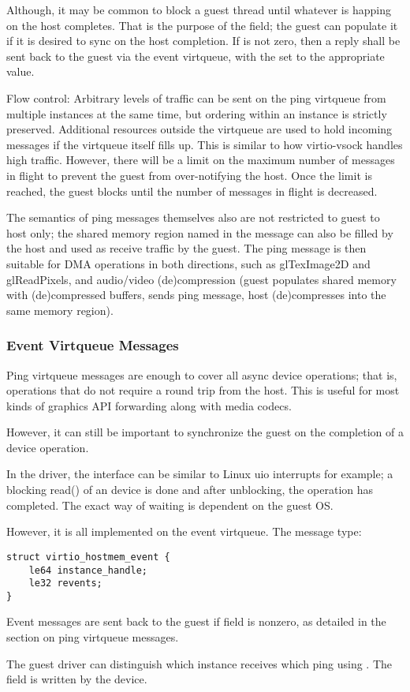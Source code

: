 Although, it may be common to block a guest thread until whatever is happing on the host completes.
That is the purpose of the  field; the guest can populate it
if it is desired to sync on the host completion.
If  is not zero, then a reply shall be sent
back to the guest via the event virtqueue,
with the  set to the appropriate value.

Flow control: Arbitrary levels of traffic can be sent
on the ping virtqueue from multiple instances at the same time,
but ordering within an instance is strictly preserved.
Additional resources outside the virtqueue are used to hold incoming messages
if the virtqueue itself fills up.
This is similar to how virtio-vsock handles high traffic.
However, there will be a limit on the maximum number of messages in flight
to prevent the guest from over-notifying the host.
Once the limit is reached, the guest blocks until the number of messages in flight
is decreased.

The semantics of ping messages themselves also are not restricted to guest to host only;
the shared memory region named in the message can also be filled by the host
and used as receive traffic by the guest.
The ping message is then suitable for DMA operations in both directions,
such as glTexImage2D and glReadPixels,
and audio/video (de)compression (guest populates shared memory with (de)compressed buffers,
sends ping message, host (de)compresses into the same memory region).

\subsubsection{Event Virtqueue Messages}\label{sec:Device Types / Host Memory Device / Device Operation / Event Virtqueue Messages}

Ping virtqueue messages are enough to cover all async device operations;
that is, operations that do not require a round trip from the host.
This is useful for most kinds of graphics API forwarding along
with media codecs.

However, it can still be important to synchronize the guest on the completion
of a device operation.

In the driver, the interface can be similar to Linux uio interrupts for example;
a blocking read() of an device is done and after unblocking,
the operation has completed.
The exact way of waiting is dependent on the guest OS.

However, it is all implemented on the event virtqueue. The message type:

\begin{lstlisting}
struct virtio_hostmem_event {
    le64 instance_handle;
    le32 revents;
}
\end{lstlisting}

Event messages are sent back to the guest if  field is nonzero,
as detailed in the section on ping virtqueue messages.

The guest driver can distinguish which instance receives which ping using
.
The field  is written by the device.

